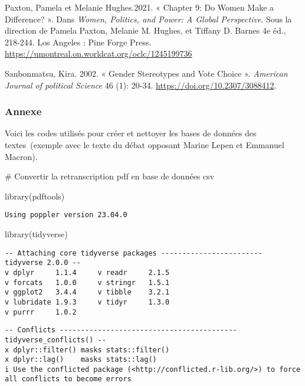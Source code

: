 \documentclass[
  letterpaper,
  DIV=11,
  numbers=noendperiod]{scrartcl}
\newenvironment{Shaded}{\begin{snugshade}}{\end{snugshade}}
\newcommand{\CommentTok}[1]{\textcolor[rgb]{0.37,0.37,0.37}{#1}}
\newcommand{\FunctionTok}[1]{\textcolor[rgb]{0.28,0.35,0.67}{#1}}
\newcommand{\NormalTok}[1]{\textcolor[rgb]{0.00,0.23,0.31}{#1}}
\begin{document}
Paxton, Pamela et Melanie Hughes.2021. « Chapter 9: Do Women Make a
Difference? ». Dans \emph{Women, Politics, and Power: A Global
Perspective}. Sous la direction de Pamela Paxton, Melanie M. Hughes, et
Tiffany D. Barnes 4e éd., 218-244. Los Angeles : Pine Forge Press.
\url{https://umontreal.on.worldcat.org/oclc/1245199736}

Sanbonmatsu, Kira. 2002. « Gender Stereotypes and Vote Choice ».
\emph{American Journal of political Science} 46 (1): 20-34.
\url{https://doi.org/10.2307/3088412}.

\hypertarget{annexe}{%
\subsubsection{Annexe}\label{annexe}}

Voici les codes utilisés pour créer et nettoyer les bases de données des
textes~(exemple avec le texte du débat opposant Marine Lepen et Emmanuel
Macron).

\begin{Shaded}
\begin{Highlighting}[]
\CommentTok{\# Convertir la retranscription pdf en base de données csv }


\FunctionTok{library}\NormalTok{(pdftools)}
\end{Highlighting}
\end{Shaded}

\begin{verbatim}
Using poppler version 23.04.0
\end{verbatim}

\begin{Shaded}
\begin{Highlighting}[]
\FunctionTok{library}\NormalTok{(tidyverse)}
\end{Highlighting}
\end{Shaded}

\begin{verbatim}
-- Attaching core tidyverse packages ------------------------ tidyverse 2.0.0 --
v dplyr     1.1.4     v readr     2.1.5
v forcats   1.0.0     v stringr   1.5.1
v ggplot2   3.4.4     v tibble    3.2.1
v lubridate 1.9.3     v tidyr     1.3.0
v purrr     1.0.2     
\end{verbatim}

\begin{verbatim}
-- Conflicts ------------------------------------------ tidyverse_conflicts() --
x dplyr::filter() masks stats::filter()
x dplyr::lag()    masks stats::lag()
i Use the conflicted package (<http://conflicted.r-lib.org/>) to force all conflicts to become errors
\end{verbatim}
\end{document}
